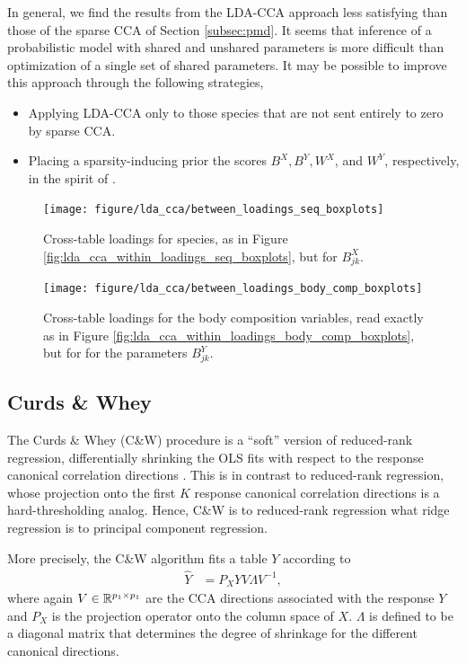 \documentclass[14pt]{extarticle}
\begin{document}
In general, we find the results from the LDA-CCA approach less satisfying than
those of the sparse CCA of Section \ref{subsec:pmd}. It seems that inference of
a probabilistic model with shared and unshared parameters is more difficult than
optimization of a single set of shared parameters. It may be possible to improve
this approach through the following strategies,

\begin{itemize}
\item Applying LDA-CCA only to those species that are not sent entirely to zero by
  sparse CCA.
\item Placing a sparsity-inducing prior the scores $B^{X}, B^{Y}, W^{X}$, and
  $W^{Y}$, respectively, in the spirit of \citep{archambeau2009sparse}.
\end{itemize}

\begin{figure}
  \centering
  \texttt{[image: figure/lda\_cca/between\_loadings\_seq\_boxplots]}
  \caption{Cross-table loadings for species, as in
    Figure \ref{fig:lda_cca_within_loadings_seq_boxplots}, but for
    $B^{X}_{jk}$. \label{fig:lda_cca_between_loadings_seq_boxplots} }
\end{figure}

\begin{figure}
  \centering
  \texttt{[image: figure/lda\_cca/between\_loadings\_body\_comp\_boxplots]}
  \caption{Cross-table loadings for the body composition variables, read exactly
    as in Figure \ref{fig:lda_cca_within_loadings_body_comp_boxplots}, but for for the
    parameters
    $B^{Y}_{jk}$. \label{fig:lda_cca_between_loadings_body_comp_boxplots}}
\end{figure}

\subsection{Curds \& Whey}
\label{subsec:cw}

The Curds \& Whey (C\&W) procedure is a ``soft'' version of reduced-rank
regression, differentially shrinking the OLS fits with respect to the response
canonical correlation directions \citep{breiman1997predicting}. This is in
contrast to reduced-rank regression, whose projection onto the first $K$
response canonical correlation directions is a hard-thresholding analog. Hence,
C\&W is to reduced-rank regression what ridge regression is to principal
component regression.

More precisely, the C\&W algorithm fits a table $Y$ according to
\begin{align}
  \hat{Y} &= P_{X}YV\Lambda V^{-1}, \label{eq:cw_yhat}
\end{align}
where again $V \in \mathbb{R}^{p_{1} \times p_{1}}$ are the CCA directions
associated with the response $Y$ and $P_{X}$ is the projection operator onto the
column space of $X$. $\Lambda$ is defined to be a diagonal matrix that determines
the degree of shrinkage for the different canonical directions.
\end{document}
